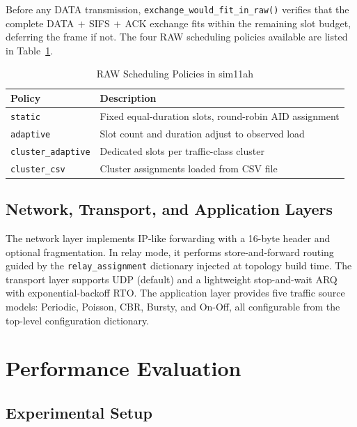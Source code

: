 \documentclass[conference]{IEEEtran}
\begin{document}
Before any DATA transmission, \texttt{exchange\_would\_fit\_in\_raw()} verifies
that the complete DATA$\,{+}\,$SIFS$\,{+}\,$ACK exchange fits within the
remaining slot budget, deferring the frame if not.
The four RAW scheduling policies available are listed in Table~\ref{tab:policies}.

\begin{table}[!t]
\renewcommand{\arraystretch}{1.15}
\caption{RAW Scheduling Policies in sim11ah}
\label{tab:policies}
\centering
\begin{tabular}{@{}ll@{}}
\toprule
\textbf{Policy} & \textbf{Description} \\
\midrule
\texttt{static}           & Fixed equal-duration slots, round-robin AID assignment \\
\texttt{adaptive}         & Slot count and duration adjust to observed load \\
\texttt{cluster\_adaptive}& Dedicated slots per traffic-class cluster \\
\texttt{cluster\_csv}     & Cluster assignments loaded from CSV file \\
\bottomrule
\end{tabular}
\end{table}

\subsection{Network, Transport, and Application Layers}

The network layer implements IP-like forwarding with a 16-byte header and
optional fragmentation.
In relay mode, it performs store-and-forward routing guided by the
\texttt{relay\_assignment} dictionary injected at topology build time.
The transport layer supports UDP (default) and a lightweight stop-and-wait
ARQ with exponential-backoff RTO.
The application layer provides five traffic source models: Periodic, Poisson,
CBR, Bursty, and On-Off, all configurable from the top-level configuration
dictionary.

\section{Performance Evaluation}
\label{sec:eval}

\subsection{Experimental Setup}
\end{document}
